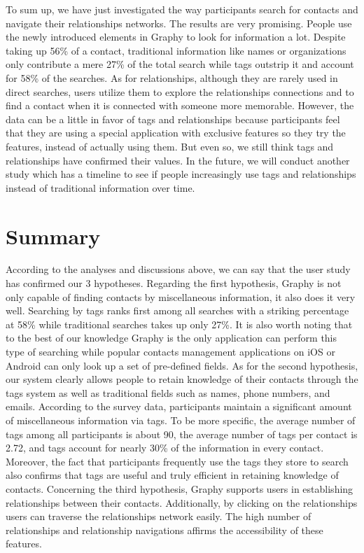 To sum up, we have just investigated the way participants search for contacts and navigate their relationships networks. The results are very promising. People use the newly introduced elements in Graphy to look for information a lot. Despite taking up 56\% of a contact, traditional information like names or organizations only contribute a mere 27\% of the total search while tags outstrip it and account for 58\% of the searches. As for relationships, although they are rarely used in direct searches, users utilize them to explore the relationships connections and to find a contact when it is connected with someone more memorable. However, the data can be a little in favor of tags and relationships because participants feel that they are using a special application with exclusive features so they try the features, instead of actually using them. But even so, we still think tags and relationships have confirmed their values. In the future, we will conduct another study which has a timeline to see if people increasingly use tags and relationships instead of traditional information over time.

\section{Summary}\label{results_summary}
According to the analyses and discussions above, we can say that the user study has confirmed our 3 hypotheses. Regarding the first hypothesis, Graphy is not only capable of finding contacts by miscellaneous information, it also does it very well. Searching by tags ranks first among all searches with a striking percentage at 58\% while traditional searches takes up only 27\%. It is also worth noting that to the best of our knowledge Graphy is the only application can perform this type of searching while popular contacts management applications on iOS or Android can only look up a set of pre-defined fields. As for the second hypothesis, our system clearly allows people to retain knowledge of their contacts through the tags system as well as traditional fields such as names, phone numbers, and emails. According to the survey data, participants maintain a significant amount of miscellaneous information via tags. To be more specific, the average number of tags among all participants is about 90, the average number of tags per contact is 2.72, and tags account for nearly 30\% of the information in every contact. Moreover, the fact that participants frequently use the tags they store to search also confirms that tags are useful and truly efficient in retaining knowledge of contacts. Concerning the third hypothesis, Graphy supports users in establishing relationships between their contacts. Additionally, by clicking on the relationships users can traverse the relationships network easily. The high number of relationships and relationship navigations affirms the accessibility of these features.

